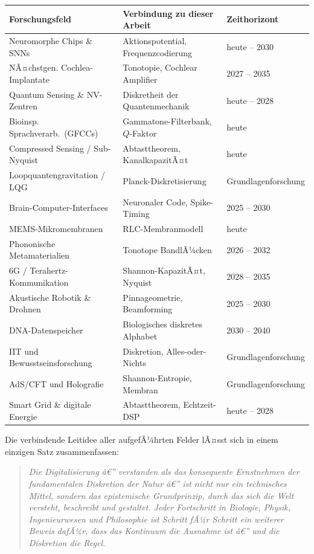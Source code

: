 ﻿\documentclass[12pt,a4paper,titlepage]{report}
\begin{document}
\begin{center}
\renewcommand{\arraystretch}{1.35}
\begin{tabular}{p{4.8cm} p{4.5cm} p{3.8cm}}
\toprule
\textbf{Forschungsfeld} & \textbf{Verbindung zu dieser Arbeit} & \textbf{Zeithorizont} \\
\midrule
Neuromorphe Chips \& SNNs & Aktionspotential, Frequenzcodierung & heute -- 2030 \\
NÃ¤chstgen. Cochlea-Implantate & Tonotopie, Cochlear Amplifier & 2027 -- 2035 \\
Quantum Sensing \& NV-Zentren & Diskretheit der Quantenmechanik & heute -- 2028 \\
Bioinsp. Sprachverarb.\ (GFCCs) & Gammatone-Filterbank, $Q$-Faktor & heute \\
Compressed Sensing / Sub-Nyquist & Abtasttheorem, KanalkapazitÃ¤t & heute \\
Loopquantengravitation / LQG & Planck-Diskretisierung & Grundlagenforschung \\
Brain-Computer-Interfaces & Neuronaler Code, Spike-Timing & 2025 -- 2030 \\
MEMS-Mikromembranen & RLC-Membranmodell & heute \\
Phononische Metamaterialien & Tonotope BandlÃ¼cken & 2026 -- 2032 \\
6G / Terahertz-Kommunikation & Shannon-KapazitÃ¤t, Nyquist & 2028 -- 2035 \\
Akustische Robotik \& Drohnen & Pinnageometrie, Beamforming & 2025 -- 2030 \\
DNA-Datenspeicher & Biologisches diskretes Alphabet & 2030 -- 2040 \\
IIT und Bewusstseinsforschung & Diskretion, Alles-oder-Nichts & Grundlagenforschung \\
AdS/CFT und Holografie & Shannon-Entropie, Membran & Grundlagenforschung \\
Smart Grid \& digitale Energie & Abtasttheorem, Echtzeit-DSP & heute -- 2028 \\
\bottomrule
\end{tabular}
\end{center}

\bigskip

Die verbindende Leitidee aller aufgefÃ¼hrten Felder lÃ¤sst sich in einem
einzigen Satz zusammenfassen:

\begin{quote}
    \itshape
    Die Digitalisierung â€” verstanden als das konsequente Ernstnehmen der
    fundamentalen Diskretion der Natur â€” ist nicht nur ein technisches Mittel,
    sondern das epistemische Grundprinzip, durch das sich die Welt
    versteht, beschreibt und gestaltet. Jeder Fortschritt in Biologie,
    Physik, Ingenieurwesen und Philosophie ist Schritt fÃ¼r Schritt
    ein weiterer Beweis dafÃ¼r, dass das Kontinuum die Ausnahme ist â€”
    und die Diskretion die Regel.
\end{quote}
\end{document}
